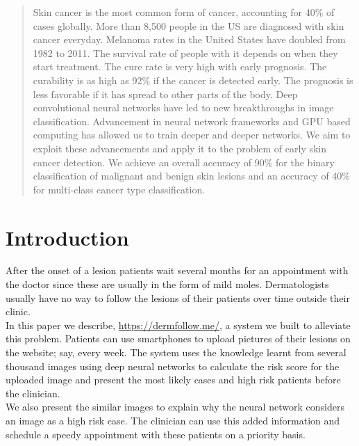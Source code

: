 \documentclass{sig-alternate-05-2015}
\begin{document}
\maketitle
\begin{abstract}
Skin cancer is the most common form of cancer, accounting for 40\% of cases globally.
More than 8,500 people in the US are diagnosed with skin cancer everyday. Melanoma rates in the United States have doubled from 1982 to 2011.
The survival rate of people with it depends on when they start treatment. The cure rate is very high
with early prognosis. The curability is as high as 92\% if the cancer is detected early. \cite{prognosticfactors} The prognosis is less favorable 
if it has spread to other parts of the body.
Deep convolutional neural networks have led to new breakthroughs in image classification.
Advancement in neural network frameworks and GPU based computing has allowed us to train deeper and deeper networks.
We aim to exploit these advancements and apply it to the problem of early skin cancer detection. We achieve an overall accuracy of 90\% for the
binary classification of malignant and benign skin lesions and an accuracy of 40\% for multi-class cancer type classification.

\end{abstract}






\section{Introduction}
After the onset of a lesion patients wait several months for an appointment with the doctor since these are usually
in the form of mild moles. Dermatologists usually have no way to follow the lesions of their patients over time
outside their clinic. \\
In this paper we describe, \url{https://dermfollow.me/}, a system we built to alleviate this problem. Patients can
use smartphones to upload pictures of their lesions on the website; say, every week. The system uses the knowledge learnt
from several thousand images using deep neural networks to calculate the risk score for the uploaded image and present the
most likely cases and high risk patients before the clinician. \\
We also present the similar images to explain why the neural network considers an image as a high risk case. The clinician can use this added
information and schedule a speedy appointment with these patients on a priority basis.
\end{document}
